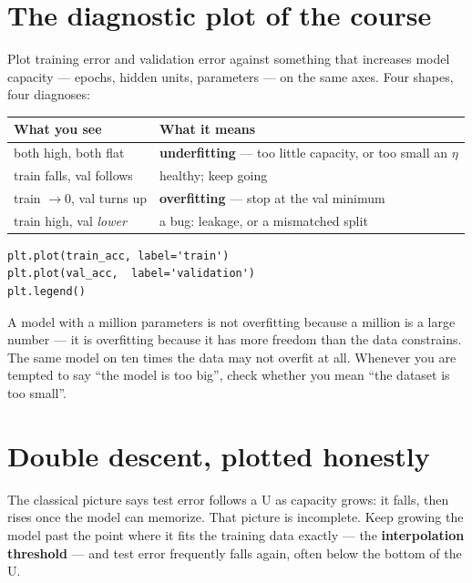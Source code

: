 \documentclass[11pt]{article}
\begin{document}
\section{The diagnostic plot of the course}

Plot training error and validation error against something that increases model
capacity --- epochs, hidden units, parameters --- on the same axes. Four shapes,
four diagnoses:

\begin{center}
\begin{tabular}{@{}ll@{}}
\toprule
What you see & What it means \\
\midrule
both high, both flat & \textbf{underfitting} --- too little capacity, or too small an $\eta$ \\
train falls, val follows & healthy; keep going \\
train $\to 0$, val turns up & \textbf{overfitting} --- stop at the val minimum \\
train high, val \emph{lower} & a bug: leakage, or a mismatched split \\
\bottomrule
\end{tabular}
\end{center}

\begin{lstlisting}
plt.plot(train_acc, label='train')
plt.plot(val_acc,  label='validation')
plt.legend()
\end{lstlisting}

\begin{keybox}
 A model with a million
parameters is not overfitting because a million is a large number --- it is
overfitting because it has more freedom than the data constrains. The same
model on ten times the data may not overfit at all. Whenever you are tempted to
say ``the model is too big'', check whether you mean ``the dataset is too small''.
\end{keybox}

\section{Double descent, plotted honestly}

The classical picture says test error follows a U as capacity grows: it falls,
then rises once the model can memorize. That picture is incomplete. Keep
growing the model past the point where it fits the training data exactly --- the
\textbf{interpolation threshold} --- and test error frequently falls again, often
below the bottom of the U.
\end{document}
